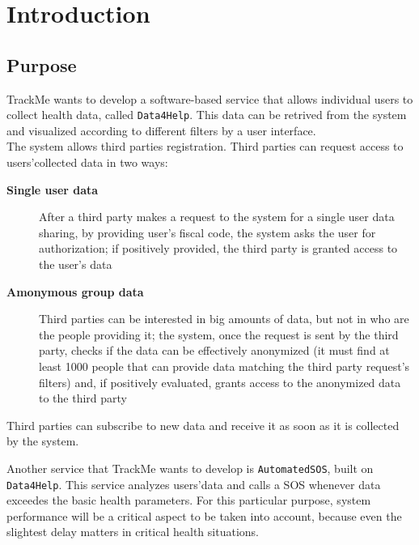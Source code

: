 \documentclass[../DD0.tex]{subfiles}
\begin{document}
\section{Introduction}
\label{sec:intro}

  \subsection{Purpose}
  \label{sec:purpose}

    TrackMe wants to develop a software-based service that allows individual users to collect health data, called \texttt{Data4Help}. This data can be retrived from the system and visualized according to different filters by a user interface. \\
    The system allows third parties registration. Third parties can request access to users'collected data in two ways:

    \begin{description}
      \item [\textbf{Single user data}] After a third party makes a request to the system for a single user data sharing, by providing  user's fiscal code, the system asks the user for authorization; if positively provided, the third party is granted access to the user's data
      \item [\textbf{Amonymous group data}] Third parties can be interested in big amounts of data, but not in who are the people providing it; the system, once the request is sent by the third party, checks if the data can be effectively anonymized (it must find at least 1000 people that can provide data matching the third party request's filters) and, if positively evaluated, grants access to the anonymized data to the third party
    \end{description}

    Third parties can subscribe to new data and receive it as soon as it is collected by the system.

    Another service that TrackMe wants to develop is \texttt{AutomatedSOS}, built on \texttt{Data4Help}. This service analyzes users'data and calls a SOS whenever data exceedes the basic health parameters. For this particular purpose, system performance will be a critical aspect to be taken into account, because even the slightest delay matters in critical health situations.
\end{document}
